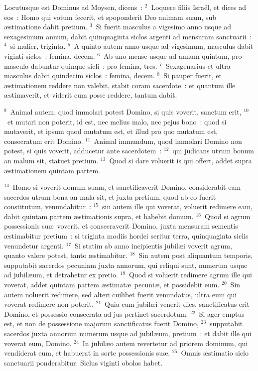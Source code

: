 \lettrine[lines=3,image=true,loversize=0.05,lraise=-0.03]{L}{}ocutusque est Dominus ad Moysen, dicens~:
${}^{2}$~Loquere filiis Isra\"el, et dices ad eos~: Homo qui votum fecerit, et spoponderit Deo animam suam, sub \ae stimatione dabit pretium.
${}^{3}$~Si fuerit masculus a vigesimo anno usque ad sexagesimum annum, dabit quinquaginta siclos argenti ad mensuram sanctuarii~:
${}^{4}$~si mulier, triginta.
${}^{5}$~A quinto autem anno usque ad vigesimum, masculus dabit viginti siclos~: femina, decem.
${}^{6}$~Ab uno mense usque ad annum quintum, pro masculo dabuntur quinque sicli~: pro femina, tres.
${}^{7}$~Sexagenarius et ultra masculus dabit quindecim siclos~: femina, decem.
${}^{8}$~Si pauper fuerit, et \ae stimationem reddere non valebit, stabit coram sacerdote~: et quantum ille \ae stimaverit, et viderit eum posse reddere, tantum dabit.


${}^{9}$~Animal autem, quod immolari potest Domino, si quis voverit, sanctum erit,
${}^{10}$~et mutari non poterit, id est, nec melius malo, nec pejus bono~: quod si mutaverit, et ipsum quod mutatum est, et illud pro quo mutatum est, consecratum erit Domino.
${}^{11}$~Animal immundum, quod immolari Domino non potest, si quis voverit, adducetur ante sacerdotem~:
${}^{12}$~qui judicans utrum bonum an malum sit, statuet pretium.
${}^{13}$~Quod si dare voluerit is qui offert, addet supra \ae stimationem quintam partem.


${}^{14}$~Homo si voverit domum suam, et sanctificaverit Domino, considerabit eam sacerdos utrum bona an mala sit, et juxta pretium, quod ab eo fuerit constitutum, venundabitur~:
${}^{15}$~sin autem ille qui voverat, voluerit redimere eam, dabit quintam partem \ae stimationis supra, et habebit domum.
${}^{16}$~Quod si agrum possessionis su\ae\ voverit, et consecraverit Domino, juxta mensuram sementis \ae stimabitur pretium~: si triginta modiis hordei seritur terra, quinquaginta siclis venundetur argenti.
${}^{17}$~Si statim ab anno incipientis jubil\ae i voverit agrum, quanto valere potest, tanto \ae stimabitur.
${}^{18}$~Sin autem post aliquantum temporis, supputabit sacerdos pecuniam juxta annorum, qui reliqui sunt, numerum usque ad jubil\ae um, et detrahetur ex pretio.
${}^{19}$~Quod si voluerit redimere agrum ille qui voverat, addet quintam partem \ae stimat\ae\ pecuni\ae , et possidebit eum.
${}^{20}$~Sin autem noluerit redimere, sed alteri cuilibet fuerit venundatus, ultra eum qui voverat redimere non poterit.
${}^{21}$~Quia cum jubil\ae i venerit dies, sanctificatus erit Domino, et possessio consecrata ad jus pertinet sacerdotum.
${}^{22}$~Si ager emptus est, et non de possessione majorum sanctificatus fuerit Domino,
${}^{23}$~supputabit sacerdos juxta annorum numerum usque ad jubil\ae um, pretium~: et dabit ille qui voverat eum, Domino.
${}^{24}$~In jubil\ae o autem revertetur ad priorem dominum, qui vendiderat eum, et habuerat in sorte possessionis su\ae .
${}^{25}$~Omnis \ae stimatio siclo sanctuarii ponderabitur. Siclus viginti obolos habet.


